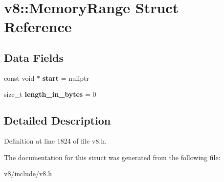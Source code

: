 \hypertarget{structv8_1_1MemoryRange}{}\section{v8\+:\+:Memory\+Range Struct Reference}
\label{structv8_1_1MemoryRange}
\subsection*{Data Fields}
\begin{DoxyCompactItemize}
\item 
\mbox{\label{structv8_1_1MemoryRange_a3dea80a77e98bb0b9ff20fa27cb13280}} 
const void $\ast$ {\bfseries start} = nullptr
\item 
\mbox{\label{structv8_1_1MemoryRange_a03b4862f20703ce8b94c30850451b870}} 
size\+\_\+t {\bfseries length\+\_\+in\+\_\+bytes} = 0
\end{DoxyCompactItemize}


\subsection{Detailed Description}


Definition at line 1824 of file v8.\+h.



The documentation for this struct was generated from the following file\+:\begin{DoxyCompactItemize}
\item 
v8/include/v8.\+h\end{DoxyCompactItemize}
